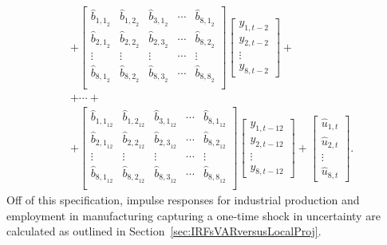 \documentclass[a4paper,11pt,listof=nochaptergap,oneside,pointednumbers,bibtotoc,bigheadings,liststotoc]{scrbook}
\theoremstyle{mysatz}
\theoremstyle{mydefinition}
\theoremstyle{mybemerkung}
\let\oldhat\hat
\newcommand{\hattnobf}[1]{\oldhat{#1}}
\begin{document}
\begin{enumerate}
\begin{equation}
\begin{split}
		& +
		\begin{bmatrix}
    		\hattnobf{b}_{{1,1}_2} & \hattnobf{b}_{{1,2}_2} & \hattnobf{b}_{{3,1}_2} & \cdots & \hattnobf{b}_{{8,1}_2}\\
    		\hattnobf{b}_{{2,1}_2} & \hattnobf{b}_{{2,2}_2} & \hattnobf{b}_{{2,3}_2} & \cdots & \hattnobf{b}_{{8,2}_2}\\
		\vdots & \vdots & \vdots & \cdots & \vdots \\
		\hattnobf{b}_{{8,1}_2} & \hattnobf{b}_{{8,2}_2} & \hattnobf{b}_{{8,3}_2} & \cdots & \hattnobf{b}_{{8,8}_2}\\
 		\end{bmatrix} 
		\begin{bmatrix}
    		y_{1,t-2} \\
    		y_{2,t-2} \\
		\vdots \\
		y_{8, t-2}
 		\end{bmatrix} +\\
		& + \cdots + \\
		& + 
		\begin{bmatrix}
    		\hattnobf{b}_{{1,1}_{12}} & \hattnobf{b}_{{1,2}_{12}} & \hattnobf{b}_{{3,1}_{12}} & \cdots & \hattnobf{b}_{{8,1}_{12}}\\
    		\hattnobf{b}_{{2,1}_{12}} & \hattnobf{b}_{{2,2}_{12}} & \hattnobf{b}_{{2,3}_{12}} & \cdots & \hattnobf{b}_{{8,2}_{12}}\\
		\vdots & \vdots & \vdots & \cdots & \vdots \\
		\hattnobf{b}_{{8,1}_{12}} & \hattnobf{b}_{{8,2}_{12}} & \hattnobf{b}_{{8,3}_{12}} & \cdots & \hattnobf{b}_{{8,8}_{12}}\\
 		\end{bmatrix} 
		\begin{bmatrix}
    		y_{1,t-12} \\
    		y_{2,t-12} \\
		\vdots \\
		y_{8, t-12}
 		\end{bmatrix}  + 
		\begin{bmatrix}
    		\hattnobf{u}_{1, t} \\
    		\hattnobf{u}_{2, t} \\
		\vdots \\
		\hattnobf{u}_{8, t}
 		\end{bmatrix}. 
	\end{split}								
	\end{equation}	
Off of this specification, impulse responses for industrial production and employment in manufacturing capturing a one-time shock in uncertainty are calculated as outlined in Section~\ref{sec:IRFsVARversusLocalProj}.


\end{enumerate}
\end{document}
